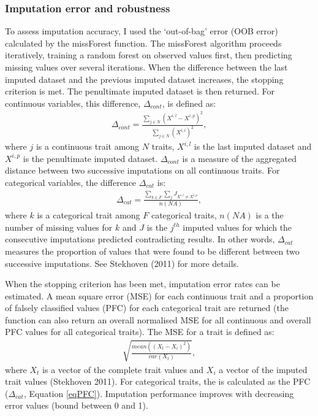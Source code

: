 \subsubsection{Imputation error and robustness}
To assess imputation accuracy, I used the `out-of-bag' error (OOB error) calculated by the missForest function. The missForest algorithm proceeds iteratively, training a random forest on observed values first, then predicting missing values over several iterations. When the difference between the last imputed dataset and the previous imputed dataset increases, the stopping criterion is met. The penultimate imputed dataset is then returned. For continuous variables, this difference, $\Delta_{cont}$,  is defined as:
\begin{align}
\Delta_{cont}=\frac{\sum_{j \in N}\left(X^{i,l}-X^{i,p}\right)^2}{\sum_{j \in N}\left(X^{i,l}\right)^2}, 
\end{align}
where $j$ is a continuous trait among $N$ traits, $X^{i,l}$ is the last imputed dataset and $X^{i,p}$ is the penultimate imputed dataset.  $\Delta_{cont}$ is a measure of the aggregated distance between two successive imputations on all continuous traits.  For categorical variables, the difference $\Delta_{cat}$ is:
\begin{align}
\Delta_{cat}=\frac{\sum_{k \in F}\sum_{j} J_{X^{i,l}\neq X^{i,p}}}{n(NA)}, 
\label{eqPFC}
\end{align}
where $k$ is a categorical trait among $F$ categorical traits, $n(NA)$ is a the number of missing values for $k$ and $J$ is the $j^{th}$ imputed values for which the consecutive imputations predicted contradicting results. In other words, $\Delta_{cat}$ measures the proportion of values that were found to be different between two successive imputations.
See Stekhoven (2011) for more details.

When the stopping criterion has been met, imputation error rates can be estimated. A mean square error (MSE) for each continuous trait and a proportion of falsely classified values (PFC) for each categorical trait are returned (the function can also return an overall normalised MSE for all continuous and overall PFC values for all categorical traits). The MSE for a trait is defined as:
\begin{align}
\sqrt{\frac{mean\left(\left(X_t-X_i\right)^2\right)}{var\left(X_t\right)}}, 
\end{align}
where $X_t$ is a vector of the complete trait values and $X_i$ a vector of the imputed trait values (Stekhoven 2011). For categorical traits, the  is calculated as the PFC ($\Delta_{cat}$, Equation \ref{eqPFC}). Imputation performance improves with decreasing error values (bound between 0 and 1).

